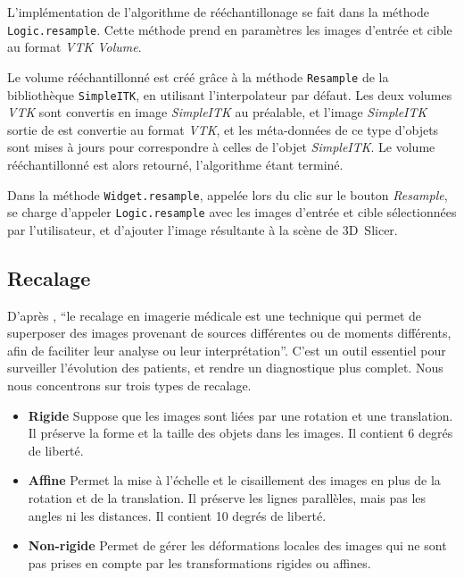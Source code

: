 \documentclass{article}
\begin{document}
{{{            \bigskip

            L'implémentation de l'algorithme de rééchantillonage se fait dans la méthode \texttt{Logic.resample}. Cette méthode prend en paramètres les images d'entrée et cible au format \textit{VTK Volume}.

            Le volume rééchantillonné est créé grâce à la méthode \texttt{Resample} de la bibliothèque \texttt{SimpleITK}, en utilisant l'interpolateur par défaut. Les deux volumes \textit{VTK} sont convertis en image \textit{SimpleITK} au préalable, et l'image \textit{SimpleITK} sortie de est convertie au format \textit{VTK}, et les méta-données de ce type d'objets sont mises à jours pour correspondre à celles de l'objet \textit{SimpleITK}. Le volume rééchantillonné est alors retourné, l'algorithme étant terminé.

            \bigskip

            Dans la méthode \texttt{Widget.resample}, appelée lors du clic sur le bouton \textit{Resample}, se charge d'appeler \texttt{Logic.resample} avec les images d'entrée et cible sélectionnées par l'utilisateur, et d'ajouter l'image résultante à la scène de 3D~Slicer.
        }
    }

    {
        \bigskip
        \subsection{Recalage}
        \label{subsec:registration-implementation}

        D'après \cite{registration}, “le recalage en imagerie médicale est une technique qui permet de superposer des images provenant de sources différentes ou de moments différents, afin de faciliter leur analyse ou leur interprétation”. C'est un outil
        essentiel pour surveiller l'évolution des patients, et rendre un diagnostique plus complet. Nous nous concentrons sur trois types de recalage.

        \begin{itemize}
            \item \textbf{Rigide} Suppose que les images sont liées par une rotation et une translation. Il préserve la forme et la taille des objets dans les images. Il contient 6 degrés de liberté.
            \item \textbf{Affine} Permet la mise à l'échelle et le cisaillement des images en plus de la rotation et de la translation. Il préserve les lignes parallèles, mais pas les angles ni les distances. Il contient 10 degrés de liberté.
            \item \textbf{Non-rigide} Permet de gérer les déformations locales des images qui ne sont pas prises en compte par les transformations rigides ou affines.
        \end{itemize}

}}
\end{document}
